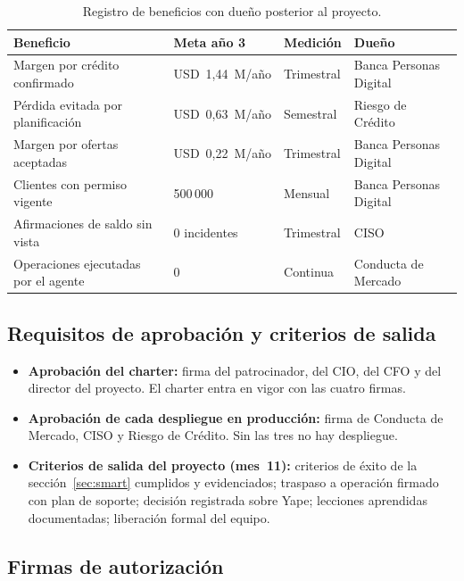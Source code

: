 \documentclass[11pt,a4paper]{article}
\newcommand{\usd}[1]{USD~#1}
\begin{document}
\begin{table}[H]
\centering
\caption{Registro de beneficios con dueño posterior al proyecto.}
\small
\begin{tabularx}{\textwidth}{@{}X l l p{3.4cm}@{}}
\toprule
\textbf{Beneficio} & \textbf{Meta año 3} & \textbf{Medición} & \textbf{Dueño} \\
\midrule
Margen por crédito confirmado & \usd{1,44}~M/año & Trimestral & Banca Personas Digital \\
Pérdida evitada por planificación & \usd{0,63}~M/año & Semestral & Riesgo de Crédito \\
Margen por ofertas aceptadas & \usd{0,22}~M/año & Trimestral & Banca Personas Digital \\
Clientes con permiso vigente & 500\,000 & Mensual & Banca Personas Digital \\
Afirmaciones de saldo sin vista & 0 incidentes & Trimestral & CISO \\
Operaciones ejecutadas por el agente & 0 & Continua & Conducta de Mercado \\
\bottomrule
\end{tabularx}
\end{table}

\subsection{Requisitos de aprobación y criterios de salida}

\begin{itemize}
  \item \textbf{Aprobación del charter:} firma del patrocinador, del CIO, del CFO y del director del proyecto. El charter entra en vigor con las cuatro firmas.
  \item \textbf{Aprobación de cada despliegue en producción:} firma de Conducta de Mercado, CISO y Riesgo de Crédito. Sin las tres no hay despliegue.
  \item \textbf{Criterios de salida del proyecto (mes~11):} criterios de éxito de la sección~\ref{sec:smart} cumplidos y evidenciados; traspaso a operación firmado con plan de soporte; decisión registrada sobre Yape; lecciones aprendidas documentadas; liberación formal del equipo.
\end{itemize}

\subsection{Firmas de autorización}
\end{document}
